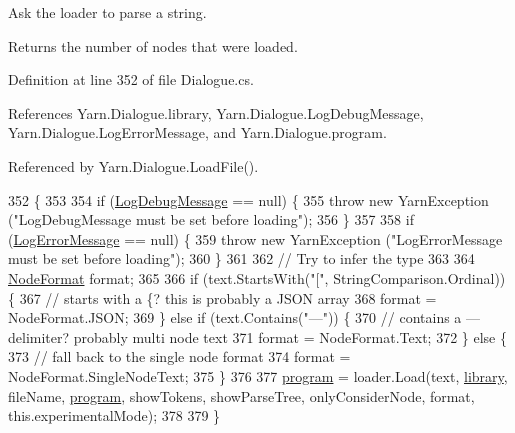 Ask the loader to parse a string. 

Returns the number of nodes that were loaded. 

Definition at line 352 of file Dialogue.\-cs.



References Yarn.\-Dialogue.\-library, Yarn.\-Dialogue.\-Log\-Debug\-Message, Yarn.\-Dialogue.\-Log\-Error\-Message, and Yarn.\-Dialogue.\-program.



Referenced by Yarn.\-Dialogue.\-Load\-File().


\begin{DoxyCode}
352                                                                                                            
                                                 \{
353 
354             \textcolor{keywordflow}{if} (\hyperlink{a00092_a381f48bb0fbb294f8cf44ca57f11be31}{LogDebugMessage} == null) \{
355                 \textcolor{keywordflow}{throw} \textcolor{keyword}{new} YarnException (\textcolor{stringliteral}{"LogDebugMessage must be set before loading"});
356             \}
357 
358             \textcolor{keywordflow}{if} (\hyperlink{a00092_a9801e83dd044d6498fdf6ebcc6bec5ac}{LogErrorMessage} == null) \{
359                 \textcolor{keywordflow}{throw} \textcolor{keyword}{new} YarnException (\textcolor{stringliteral}{"LogErrorMessage must be set before loading"});
360             \}
361 
362             \textcolor{comment}{// Try to infer the type}
363 
364             \hyperlink{a00051_ad7ebb46e7309ead8767383a672b3272f}{NodeFormat} format;
365 
366             \textcolor{keywordflow}{if} (text.StartsWith(\textcolor{stringliteral}{"["}, StringComparison.Ordinal)) \{
367                 \textcolor{comment}{// starts with a \{? this is probably a JSON array}
368                 format = NodeFormat.JSON;
369             \} \textcolor{keywordflow}{else} \textcolor{keywordflow}{if} (text.Contains(\textcolor{stringliteral}{"---"})) \{
370                 \textcolor{comment}{// contains a --- delimiter? probably multi node text}
371                 format = NodeFormat.Text;
372             \} \textcolor{keywordflow}{else} \{
373                 \textcolor{comment}{// fall back to the single node format}
374                 format = NodeFormat.SingleNodeText;
375             \}
376 
377             \hyperlink{a00092_a0a1cca92325f430425d784d416cb5c2b}{program} = loader.Load(text, \hyperlink{a00092_ae660d4cfb6e296358d2f61d8ee74c66a}{library}, fileName, \hyperlink{a00092_a0a1cca92325f430425d784d416cb5c2b}{program}, showTokens, 
      showParseTree, onlyConsiderNode, format, this.experimentalMode);
378 
379         \}
\end{DoxyCode}


